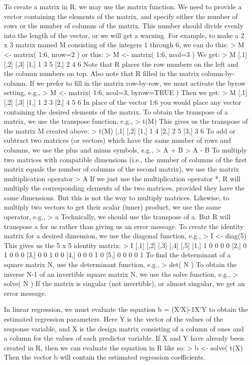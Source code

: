 To create a matrix in R, we may use the matrix function.  We need to provide a vector containing the elements of the matrix, and specify either the number of rows or the number of columns of the matrix.  This number should divide evenly into the length of the vector, or we will get a warning.  For example, to make a 2 x 3 matrix named M consisting of the integers 1 through 6, we can do this:
> M <- matrix( 1:6, nrow=2 )
or this:
> M <- matrix( 1:6, ncol=3 )
We get:
> M
     [,1] [,2] [,3]
[1,]    1    3    5
[2,]    2    4    6
Note that R places the row numbers on the left and the column numbers on top.  Also note that R filled in the matrix column-by-column.  If we prefer to fill in the matrix row-by-row, we must activate the byrow setting, e.g.,
> M <- matrix( 1:6, ncol=3, byrow=TRUE )
Then we get:
> M
     [,1] [,2] [,3]
[1,]    1    2    3
[2,]    4    5    6
In place of the vector 1:6  you would place any vector containing the desired elements of the matrix.
To obtain the transpose of a matrix, we use the transpose function, e.g.,
> t(M)
This gives us the transpose of the matrix M created above:
> t(M)
     [,1] [,2]
[1,]    1    4
[2,]    2    5
[3,]    3    6
To add or subtract two matrices (or vectors) which have the same number of rows and columns, we use the plus and minus symbols, e.g.,
> A + B
> A - B
To multiply two matrices with compatible dimensions (i.e., the number of columns of the first matrix equals the number of columns of the second matrix), we use the matrix multiplication operator %
> A %
If we just use the multiplication operator *,  R will multiply the corresponding elements of the two matrices, provided they have the same dimensions.  But this is not the way to multiply matrices.
Likewise, to multiply two vectors to get their scalar (inner) product, we use the same operator, e.g.,
> a %
Technically, we should use the transpose of a.  But R will transpose a for us rather than giving us an error message.
To create the identity matrix for a desired dimension, we use the diagonal function, e.g.,
> I <- diag(5)
This gives us the 5 x 5 identity matrix:
> I
     [,1] [,2] [,3] [,4] [,5]
[1,]    1    0    0    0    0
[2,]    0    1    0    0    0
[3,]    0    0    1    0    0
[4,]    0    0    0    1    0
[5,]    0    0    0    0    1
To find the determinant of a square matrix N, use the determinant function, e.g.,
> det( N )
To obtain the inverse N-1 of an invertible square matrix N, we use the solve function, e.g.,
> solve( N )
If the matrix is singular (not invertible), or almost singular, we get an error message.

In linear regression, we must evaluate the equation b = (X'X)-1X'Y to obtain the estimated regression parameters.  Here Y is the vector of the values of the response variable, and X is the design matrix consisting of a column of ones and a column for the values of each predictor variable.  If X and Y have already been created in R, then we can evaluate the equation in R like so:
> b <- solve( t(X) %
Then the vector b will contain the estimated regression coefficients.



